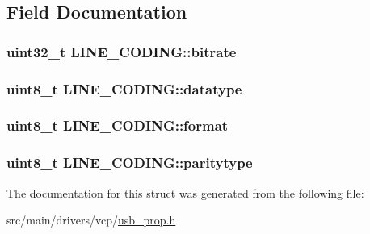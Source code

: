 \subsection{Field Documentation}
\hypertarget{structLINE__CODING_a2e1429240f2631af0a2be3c2b5a1ef33}{
\subsubsection[{bitrate}]{\setlength{\rightskip}{0pt plus 5cm}uint32\+\_\+t L\+I\+N\+E\+\_\+\+C\+O\+D\+I\+N\+G\+::bitrate}}\label{structLINE__CODING_a2e1429240f2631af0a2be3c2b5a1ef33}
\hypertarget{structLINE__CODING_a4e60e8f03ca205d2bae060c5ad551be3}{
\subsubsection[{datatype}]{\setlength{\rightskip}{0pt plus 5cm}uint8\+\_\+t L\+I\+N\+E\+\_\+\+C\+O\+D\+I\+N\+G\+::datatype}}\label{structLINE__CODING_a4e60e8f03ca205d2bae060c5ad551be3}
\hypertarget{structLINE__CODING_a84359fc6fe07038511cab5d987ce88a3}{
\subsubsection[{format}]{\setlength{\rightskip}{0pt plus 5cm}uint8\+\_\+t L\+I\+N\+E\+\_\+\+C\+O\+D\+I\+N\+G\+::format}}\label{structLINE__CODING_a84359fc6fe07038511cab5d987ce88a3}
\hypertarget{structLINE__CODING_af9d1a3bc78890998d5c5892c6444a39e}{
\subsubsection[{paritytype}]{\setlength{\rightskip}{0pt plus 5cm}uint8\+\_\+t L\+I\+N\+E\+\_\+\+C\+O\+D\+I\+N\+G\+::paritytype}}\label{structLINE__CODING_af9d1a3bc78890998d5c5892c6444a39e}


The documentation for this struct was generated from the following file\+:\begin{DoxyCompactItemize}
\item 
src/main/drivers/vcp/\hyperlink{usb__prop_8h}{usb\+\_\+prop.\+h}\end{DoxyCompactItemize}
